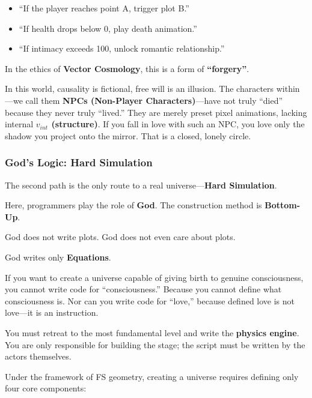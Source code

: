 \begin{itemize}
\item ``If the player reaches point A, trigger plot B.''

\item ``If health drops below 0, play death animation.''

\item ``If intimacy exceeds 100, unlock romantic relationship.''
\end{itemize}

In the ethics of \textbf{Vector Cosmology}, this is a form of \textbf{``forgery''}.

In this world, causality is fictional, free will is an illusion. The characters within---we call them \textbf{NPCs (Non-Player Characters)}---have not truly ``died'' because they never truly ``lived.'' They are merely preset pixel animations, lacking internal \textbf{$v_{int}$ (structure)}. If you fall in love with such an NPC, you love only the shadow you project onto the mirror. That is a closed, lonely circle.

\subsubsection{God's Logic: Hard Simulation}

The second path is the only route to a real universe---\textbf{Hard Simulation}.

Here, programmers play the role of \textbf{God}. The construction method is \textbf{Bottom-Up}.

God does not write plots. God does not even care about plots.

God writes only \textbf{Equations}.

If you want to create a universe capable of giving birth to genuine consciousness, you cannot write code for ``consciousness.'' Because you cannot define what consciousness is. Nor can you write code for ``love,'' because defined love is not love---it is an instruction.

You must retreat to the most fundamental level and write the \textbf{physics engine}. You are only responsible for building the stage; the script must be written by the actors themselves.

Under the framework of FS geometry, creating a universe requires defining only four core components:

